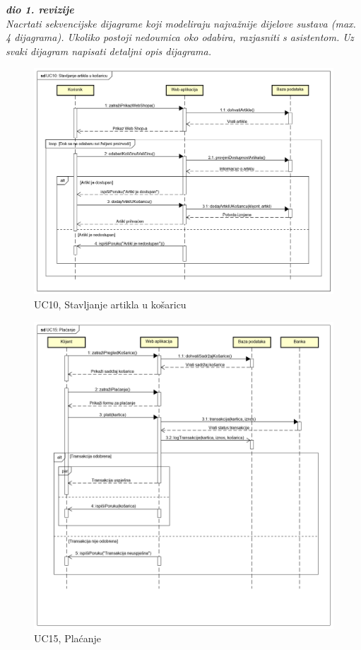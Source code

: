 				\textbf{\textit{dio 1. revizije}}\\
				
				\textit{Nacrtati sekvencijske dijagrame koji modeliraju najvažnije dijelove sustava (max. 4 dijagrama). Ukoliko postoji nedoumica oko odabira, razjasniti s asistentom. Uz svaki dijagram napisati detaljni opis dijagrama.}
				\eject
				
				\begin{figure}[H]
					\includegraphics[scale=0.4]{dijagrami/UC10.png}
					\centering
					\caption{UC10, Stavljanje artikla u košaricu}
					\label{fig:SequanceDiagram1}
				\end{figure}
			
				\begin{figure}[H]
					\includegraphics[scale=0.4]{dijagrami/UC15.png}
					\centering
					\caption{UC15, Plaćanje}
					\label{fig:SequanceDiagram2}
				\end{figure}
			
